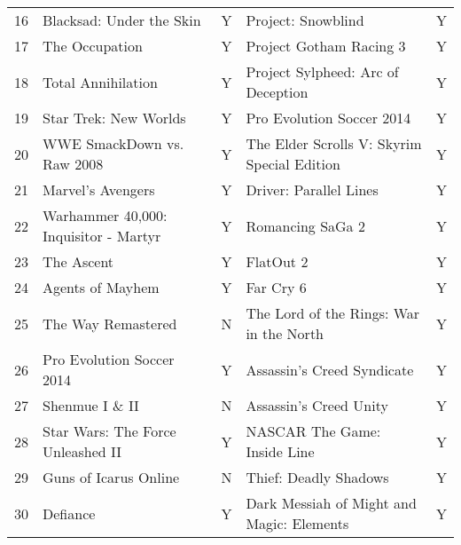\begin{tabular}{rllll}
   16 &                    Blacksad: Under the Skin &         Y &                          Project: Snowblind &         Y \\
   17 &                              The Occupation &         Y &                     Project Gotham Racing 3 &         Y \\
   18 &                          Total Annihilation &         Y &          Project Sylpheed: Arc of Deception &         Y \\
   19 &                       Star Trek: New Worlds &         Y &                   Pro Evolution Soccer 2014 &         Y \\
   20 &                  WWE SmackDown vs. Raw 2008 &         Y & The Elder Scrolls V: Skyrim Special Edition &         Y \\
   21 &                           Marvel's Avengers &         Y &                      Driver: Parallel Lines &         Y \\
   22 &       Warhammer 40,000: Inquisitor - Martyr &         Y &                            Romancing SaGa 2 &         Y \\
   23 &                                  The Ascent &         Y &                                   FlatOut 2 &         Y \\
   24 &                            Agents of Mayhem &         Y &                                   Far Cry 6 &         Y \\
   25 &                          The Way Remastered &         N &     The Lord of the Rings: War in the North &         Y \\
   26 &                   Pro Evolution Soccer 2014 &         Y &                  Assassin's Creed Syndicate &         Y \\
   27 &                              Shenmue I \& II &         N &                      Assassin's Creed Unity &         Y \\
   28 &           Star Wars: The Force Unleashed II &         Y &                NASCAR The Game: Inside Line &         Y \\
   29 &                       Guns of Icarus Online &         N &                       Thief: Deadly Shadows &         Y \\
   30 &                                    Defiance &         Y &   Dark Messiah of Might and Magic: Elements &         Y \\
\bottomrule
\end{tabular}
